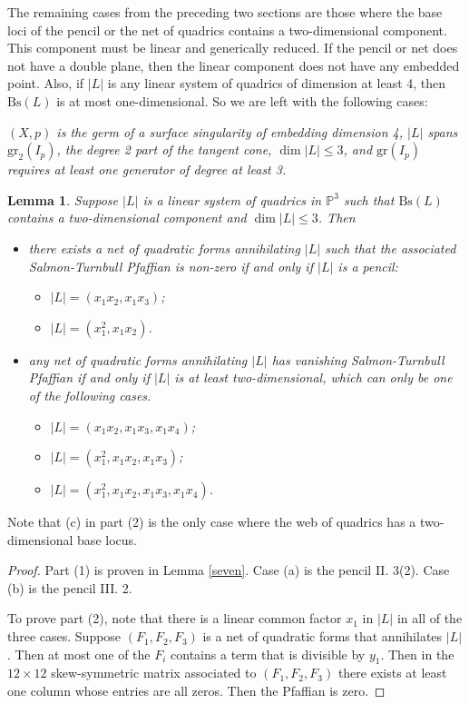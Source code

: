 \documentclass{amsart}[12pt]
\newtheorem{lemma}[theorem]{Lemma}
\theoremstyle{definition}
\theoremstyle{remark}
\numberwithin{equation}{section}
\newcommand{\abs}[1]{\lvert#1\rvert}
\begin{document}
The remaining cases from the preceding two sections are those where the base loci of the pencil or the net of quadrics contains a two-dimensional component. This component must be linear and generically reduced. If the pencil or net does not have a double plane, then the linear component does not have any embedded point. Also, if $\abs{L}$ is any linear system of quadrics of dimension at least 4, then $\mathrm{Bs}(L)$ is at most one-dimensional. So we are left with the following cases: 

\textit{$(X, p)$ is the germ of a surface singularity of embedding dimension 4, $\abs{L}$ spans $\mathrm{gr}_2(I_p)$, the degree 2 part of the tangent cone, $\dim \abs{L} \leq 3$, and $\mathrm{gr}(I_p)$ requires at least one generator of degree at least 3. }

\begin{lemma}\label{cubic}
Suppose $\abs{L}$ is a linear system of quadrics in $\mathbb{P}^3$ such that $\mathrm{Bs}(L)$ contains a two-dimensional component and $\dim \abs{L} \leq 3$. Then 
\begin{itemize}
\item[(1)] there exists a net of quadratic forms annihilating $\abs{L}$ such that the associated Salmon-Turnbull Pfaffian is non-zero if and only if $\abs{L}$ is a pencil:
\begin{itemize}
\item[(a)] $\abs{L} = (x_1x_2, x_1x_3)$;
\item[(b)] $\abs{L} = (x_1^2, x_1x_2)$.
\end{itemize}
\item[(2)] any net of quadratic forms annihilating $\abs{L}$ has vanishing Salmon-Turnbull Pfaffian if and only if $\abs{L}$ is at least two-dimensional, which can only be one of the following cases.
\begin{itemize}
\item[(a)] $\abs{L} = (x_1x_2, x_1x_3, x_1x_4)$;
\item[(b)] $\abs{L} = (x_1^2, x_1x_2, x_1x_3)$;
\item[(c)] $\abs{L} = (x_1^2, x_1x_2, x_1x_3, x_1x_4)$.
\end{itemize}
\end{itemize}
\end{lemma}
Note that (c) in part (2) is the only case where the web of quadrics has a two-dimensional base locus. 

\begin{proof}
Part (1) is proven in Lemma \ref{seven}. Case (a) is the pencil II. 3(2). Case (b) is the pencil III. 2.

To prove part (2), note that there is a linear common factor $x_1$ in $\abs{L}$ in all of the three cases. Suppose $(F_1, F_2, F_3)$ is a net of quadratic forms that annihilates $\abs{L}$. Then at most one of the $F_i$ contains a term that is divisible by $y_1$. Then in the $12 \times 12$ skew-symmetric matrix associated to $(F_1, F_2, F_3)$ there exists at least one column whose entries are all zeros. Then the Pfaffian is zero. 
\end{proof}
\end{document}
